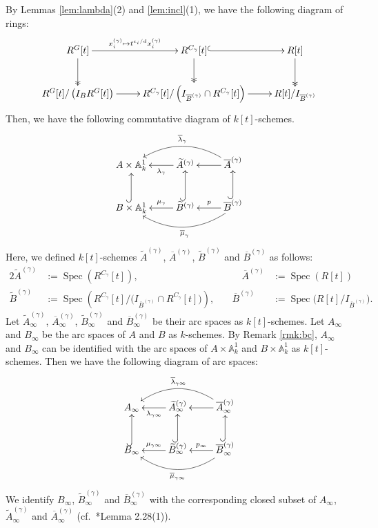 \documentclass[a4paper,11pt]{amsart}
\theoremstyle{definition}
\theoremstyle{remark}
\begin{document}
By Lemmas \ref{lem:lambda}(2) and \ref{lem:incl}(1), we have the following diagram of rings: 
\[
  \xymatrix{
R^{G}[t] \ar[r] ^-{x_i^{(\gamma)} \mapsto t^{e_i/d} x_i^{(\gamma)}} \ar@{->>}[d] & R^{C_{\gamma}}[t] \ar@{->>}[d] \ar@{^{(}->}[r] & R[t] \ar@{->>}[d] \\
R^G[t]/ \left( I_B R^G[t] \right)  \ar[r] & R^{C_{\gamma}}[t]/ \left( I_{\overline{B} ^{(\gamma)}} \cap R^{C_{\gamma}}[t] \right) \ar[r]   & R[t] / I_{\overline{B} ^{(\gamma)}}
}
\]
Then, we have the following commutative diagram of $k[t]$-schemes. 
\[
  \xymatrix{
A \times \mathbb{A}^1 _k & \widetilde{A}^{(\gamma)} \ar[l]^-{\lambda _{\gamma}} & \overline{A}^{(\gamma)} \ar[l] \ar@/_20pt/[ll]_-{\overline{\lambda} _{\gamma}} \\
B \times \mathbb{A}^1 _k \ar@{^{(}->}[u] & \widetilde{B}^{(\gamma)} \ar@{^{(}->}[u] \ar[l]_-{\mu _{\gamma}} &  \overline{B}^{(\gamma)} \ar[l]_-{p} \ar@{^{(}->}[u] \ar@/^20pt/[ll]^-{\overline{\mu} _{\gamma}}
  }
\]
Here, we defined $k[t]$-schemes $\widetilde{A}^{(\gamma)}$, $\overline{A}^{(\gamma)}$, $\widetilde{B}^{(\gamma)}$ and $\overline{B}^{(\gamma)}$ as follows: 
\begin{alignat*}{2}
\widetilde{A}^{(\gamma)} &:= \operatorname{Spec} \left( R^{C_{\gamma}}[t] \right), &
	\quad \overline{A}^{(\gamma)} &:= \operatorname{Spec} (R[t]) \\
\widetilde{B}^{(\gamma)} &:= \operatorname{Spec} \left( R^{C_{\gamma}}[t]/ \bigl ( I_{\overline{B} ^{(\gamma)}} \cap R^{C_{\gamma}}[t] \bigr ) \right), \quad &
	\overline{B}^{(\gamma)} &:= \operatorname{Spec} \bigl( R[t] / I_{\overline{B} ^{(\gamma)}} \bigr). 
\end{alignat*}
Let $\widetilde{A}^{(\gamma)}_{\infty}$, $\overline{A}^{(\gamma)} _{\infty}$, $\widetilde{B}_{\infty}^{(\gamma)}$ and $\overline{B}_{\infty}^{(\gamma)}$ be their arc spaces as $k[t]$-schemes. 
Let $A_{\infty}$ and $B_{\infty}$ be the arc spaces of $A$ and $B$ as $k$-schemes. 
By Remark \ref{rmk:bc}, $A_{\infty}$ and $B_{\infty}$ can be identified with the arc spaces of $A \times \mathbb{A}^1 _k$ and $B \times \mathbb{A}^1 _k$ as $k[t]$-schemes. 
Then we have the following diagram of arc spaces: 
\[
\xymatrix{
A_{\infty} & \widetilde{A}^{(\gamma)}_{\infty} \ar[l]^-{\lambda _{\gamma \infty}} & \overline{A}^{(\gamma)} _{\infty} \ar[l] \ar@/_20pt/[ll]_{\overline{\lambda} _{\gamma \infty}} \\
B_{\infty} \ar@{^{(}-{>}}[u] & \widetilde{B}_{\infty} ^{(\gamma)} \ar[l]_-{\mu _{\gamma \infty}} \ar@{^{(}-{>}}[u] & \overline{B}_{\infty} ^{(\gamma)} \ar[l]_-{p _{\infty}} \ar@{^{(}-{>}}[u] \ar@/^20pt/[ll]^-{\overline{\mu} _{\gamma \infty}}
}
\]
We identify $B_{\infty}$, $\widetilde{B}_{\infty} ^{(\gamma)}$ and $\overline{B}_{\infty} ^{(\gamma)}$ with the corresponding closed subset of $A_{\infty}$, $\widetilde{A}^{(\gamma)}_{\infty}$ and $\overline{A}^{(\gamma)} _{\infty}$ (cf.\ \cite{NS22}*{Lemma 2.28(1)}). 
\end{document}
